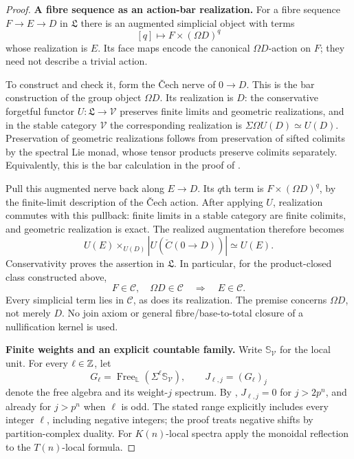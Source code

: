 \begin{proof}
\medskip\noindent
\textbf{A fibre sequence as an action-bar realization.}
For a fibre sequence $F\to E\to D$ in $\mathfrak L$ there is an
augmented simplicial object with terms
\[
 [q]\longmapsto F\times(\Omega D)^q
\]
whose realization is $E$. Its face maps encode the canonical
$\Omega D$-action on $F$; they need not describe a trivial action.

To construct and check it, form the \v{C}ech nerve of $0\to D$.
This is the bar construction of the group object $\Omega D$.
Its realization is $D$: the conservative forgetful functor
$U:\mathfrak L\to\mathcal V$ preserves finite limits and
geometric realizations, and in the stable category $\mathcal V$
the corresponding realization is
$\Sigma\Omega U(D)\simeq U(D)$.
Preservation of geometric realizations follows from preservation
of sifted colimits by the spectral Lie monad, whose tensor
products preserve colimits separately. Equivalently, this is
the bar calculation in the proof of
\cite[Proposition~4.11]{I_BlansHeuts2026}.

Pull this augmented nerve back along $E\to D$. Its $q$th term
is $F\times(\Omega D)^q$, by the finite-limit description of
the \v{C}ech action. After applying $U$, realization commutes
with this pullback: finite limits in a stable category are
finite colimits, and geometric realization is exact. The
realized augmentation therefore becomes
\[
 U(E)\mathop{\times}_{U(D)}
       |U(\check C(0\to D))|\simeq U(E).
\]
Conservativity proves the assertion in $\mathfrak L$. In
particular, for the product-closed class constructed above,
\[
 F\in\mathcal C,\quad \Omega D\in\mathcal C
 \quad\Longrightarrow\quad E\in\mathcal C.
 \tag{D.2.11d}
\]
Every simplicial term lies in $\mathcal C$, as does its
realization. The premise concerns $\Omega D$, not merely $D$.
No join axiom or general fibre/base-to-total closure of a
nullification kernel is used.

\medskip\noindent
\textbf{Finite weights and an explicit countable family.}
Write $\mathbb S_{\mathcal V}$ for the local unit. For every
$\ell\in\mathbb Z$, let
\[
 G_\ell=\operatorname{Free}_{\mathbb L}
                (\Sigma^\ell\mathbb S_{\mathcal V}),
 \qquad J_{\ell,j}=(G_\ell)_j
\]
denote the free algebra and its weight-$j$ spectrum. By
\cite[Theorem~4.22 and Corollary~4.23]{I_Heuts2021},
$J_{\ell,j}=0$ for $j>2p^n$, and already for $j>p^n$ when
$\ell$ is odd. The stated range explicitly includes every
integer $\ell$, including negative integers; the proof treats
negative shifts by partition-complex duality. For $K(n)$-local
spectra apply the monoidal reflection to the $T(n)$-local
formula.


\end{proof}
